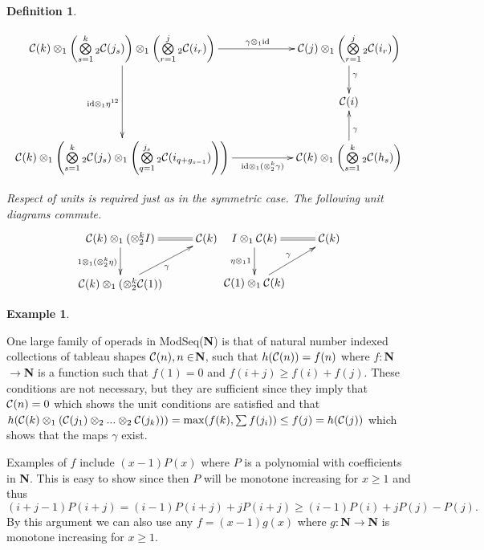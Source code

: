\documentclass{tac}
\newtheorem{definition}{Definition}
\newtheorem{example}{Example}
\begin{document}
{\begin{definition}
\begin{enumerate}
      $$
      \xymatrix{
      {\cal C}(k)\otimes_1\left(\bigotimes\limits_{s=1}^k{}_2 {\cal C}(j_s)\right)\otimes_1\left(\bigotimes\limits_{r=1}^j{}_2 {\cal C}(i_r)\right)
      \ar[rr]^>>>>>>>>>>>>{\gamma \otimes_1 \text{id}}
      \ar[dd]_{\text{id} \otimes_1 \eta^{12}}
      &&{\cal C}(j)\otimes_1 \left(\bigotimes\limits_{r=1}^j{}_2 {\cal C}(i_r)\right)
      \ar[d]^{\gamma}
      \\
      &&{\cal C}(i)
      \\
      {\cal C}(k)\otimes_1 \left(\bigotimes\limits_{s=1}^k{}_2 {\cal C}(j_s)\otimes_1\left(\bigotimes\limits_{q=1}^{j_s}{}_2 {\cal C}(i_{q+g_{s-1}})\right)\right)
      \ar[rr]_>>>>>>>>>>{\text{id} \otimes_1(\otimes^k_2\gamma)}
      &&{\cal C}(k)\otimes_1\left(\bigotimes\limits_{s=1}^k{}_2 {\cal C}(h_s)\right)
      \ar[u]_{\gamma}
      }
      $$
      \end{enumerate}
     Respect of units is required just as in the symmetric case.
          The following unit diagrams commute.
      $$
      \xymatrix{
      {\cal C}(k)\otimes_1 (\otimes_2^k I)
      \ar[d]_{1\otimes_1(\otimes_2^k \eta)}
      \ar@{=}[r]^{}
      &{\cal C}(k)\\
      {\cal C}(k)\otimes_1(\otimes_2^k {\cal C}(1))
      \ar[ur]_{\gamma}
      }
      \xymatrix{
      I\otimes_1 {\cal C}(k)
      \ar[d]_{\eta\otimes_1 1}
      \ar@{=}[r]^{}
      &{\cal C}(k)\\
      {\cal C}(1)\otimes_1 {\cal C}(k)
      \ar[ur]^{\gamma}
      }
      $$
      \end{definition}
      
      \begin{example}
      ~
      \end{example}
      One large family of operads in ModSeq({\bf N}) is that of natural number indexed collections of tableau shapes
       ${\cal C}(n), n\in${\bf N}, such that
      $h({\cal C}(n)) = f(n)$ where $f:${\bf N}$\to${\bf N} is a function such 
      that $f(1) = 0$ and $f(i+j)\ge f(i) + f(j).$
      These conditions are not necessary, but they are sufficient since they imply that ${\cal C}(n) =0$ which shows the
      unit conditions are satisfied and that 
      $h({\cal C}(k)\otimes_1({\cal C}(j_1)\otimes_2...\otimes_2{\cal C}(j_k))) =
       \max(f(k), \sum{f(j_i)}) \le f(j) =h({\cal C}(j))$ which shows that the maps $\gamma$ exist. 
      

      
      Examples of $f$ include  $(x-1)P(x)$ where $P$ is a polynomial with coefficients in {\bf N}. This is easy to show
      since then $P$ will be monotone increasing for 
      $x\ge 1$ and thus $(i+j-1)P(i+j) = (i-1)P(i+j)+jP(i+j) \ge (i-1)P(i)+jP(j) - P(j).$
      By this argument we can also use any $f= (x-1)g(x)$ where $g:${\bf N}$\to${\bf N} is monotone  increasing 
      for $x \ge 1.$
      
}
\end{document}
